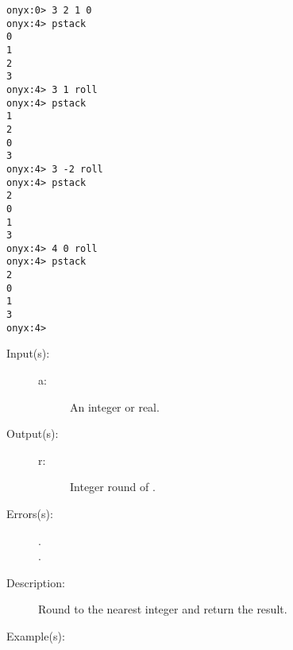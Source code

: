 \begin{description}
\begin{description}
\begin{verbatim}
onyx:0> 3 2 1 0 
onyx:4> pstack
0
1
2
3
onyx:4> 3 1 roll
onyx:4> pstack
1
2
0
3
onyx:4> 3 -2 roll
onyx:4> pstack
2
0
1
3
onyx:4> 4 0 roll
onyx:4> pstack
2
0
1
3
onyx:4>
		\end{verbatim}
	\end{description}
\label{systemdict:round}
\item[{\onyxop{a}{round}{r}}: ]
	\begin{description}\item[]
	\item[Input(s): ]
		\begin{description}\item[]
		\item[a: ]
			An integer or real.
		\end{description}
	\item[Output(s): ]
		\begin{description}\item[]
		\item[r: ]
			Integer round of .
		\end{description}
	\item[Errors(s): ]
		\begin{description}\item[]
		\item[.]
		\item[.]
		\end{description}
	\item[Description: ]
		Round  to the nearest integer and return the result.
	\item[Example(s): ]\begin{verbatim}


\end{verbatim}
\end{description}
\end{description}
